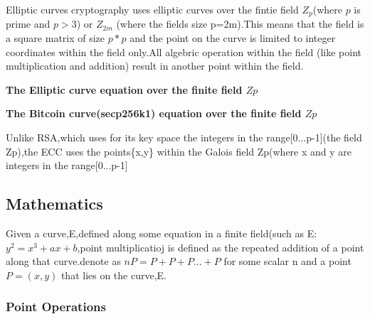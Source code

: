 \documentclass{article}
\begin{document}
Elliptic curves cryptography uses elliptic curves over the fintie field \(Z_{p}\)(where \(p\) is prime and \(p>3\)) or \(Z_{2m}\) (where the fields size p=2m).This means that the field is a square matrix of size \(p*p\) and the point on the curve is limited to integer coordinates within the field only.All algebric operation within the field (like point multiplication and addition) result in another point within the field.

\textbf{The Elliptic curve equation over the finite field \(Zp\)}

\hspace{4.5cm}
\begin{centre}
\end{centre}

\textbf{The Bitcoin curve(secp256k1) equation over the finite field \(Zp\)}

\hspace{4.5cm}
\begin{centre}
\end{centre}

Unlike RSA,which uses for its key space the integers in the range[0...p-1](the field Zp),the ECC uses the points\{x,y\} within the Galois field Zp(where x and y are integers in the range[0...p-1]

\subsection{Mathematics}
Given a curve,E,defined along some equation in a finite field(such as E:\(y^2=x^3+ax+b\),point multiplicatioj is defined as the repeated addition of a point along that curve.denote as \(nP=P+P+P...+P\) for some scalar n and a point \(P=(x,y)\) that lies on  the curve,E.
\subsubsection{Point Operations}
\end{document}
